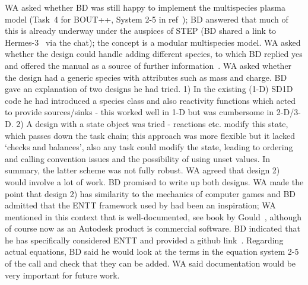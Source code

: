 WA asked whether BD was still happy to implement the multispecies plasma model
(Task~4 for BOUT++, System 2-5 in ref~\cite{pappeqs}); BD 
answered that much of this is already underway under the auspices of STEP (BD 
shared a link to Hermes-3~\cite{hermes3website}  via the chat); the concept is a modular 
multispecies model.  WA asked whether the design could handle adding different 
species, to which BD replied yes and offered the manual as a source of further 
information~\cite{hermes-3strucwebsite}.  WA asked whether the design had a 
generic species with attributes such as mass and charge.  BD gave an 
explanation of two designs he had tried.  1) In the existing (1-D) SD1D code he 
had introduced a species class and also reactivity functions which acted to 
provide sources/sinks - this worked well in 1-D but was cumbersome in 2-D/3-D. 
2) A design with a state object was tried - reactions etc. modify this 
state, which passes down the task chain; this approach was more flexible but it 
lacked `checks and balances', also any task could modify the state, leading to 
ordering and calling convention issues and the possibility of using unset values.
In summary, the latter scheme was not fully robust.  WA agreed that design 2) would 
involve a lot of work.  BD promised to write up both designs.  WA made the 
point that design 2) has similarity to the mechanics of computer games and BD 
admitted that the ENTT framework used by  had been an inspiration; WA 
mentioned in this context that  is well-documented, see book by Gould~\cite{gould},
although of course  now as an Autodesk product is commercial software.
BD indicated that he has specifically considered  ENTT 
and provided a github link~\cite{enttwebsite}.  Regarding actual equations, BD said he would look at 
the terms in the equation system 2-5 of the call and check that they can be added.  WA said 
documentation would be very important for future work.

